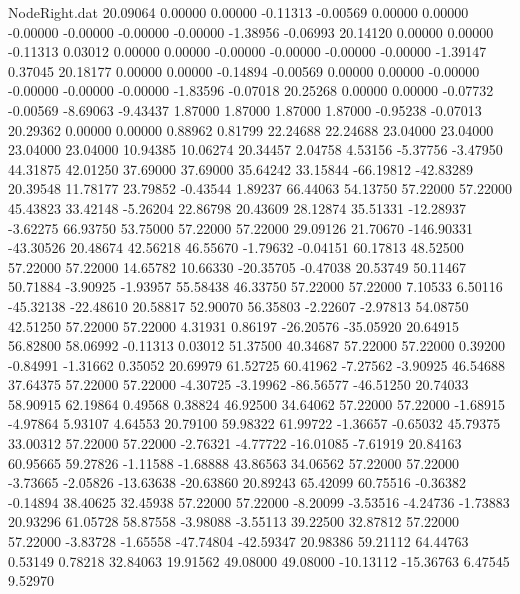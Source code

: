 \begin{filecontents}{NodeRight.dat}
  20.09064    0.00000    0.00000    -0.11313   -0.00569    0.00000    0.00000   -0.00000   -0.00000   -0.00000   -0.00000   -1.38956   -0.06993
  20.14120    0.00000    0.00000    -0.11313    0.03012    0.00000    0.00000   -0.00000   -0.00000   -0.00000   -0.00000   -1.39147    0.37045
  20.18177    0.00000    0.00000    -0.14894   -0.00569    0.00000    0.00000   -0.00000   -0.00000   -0.00000   -0.00000   -1.83596   -0.07018
  20.25268    0.00000    0.00000    -0.07732   -0.00569   -8.69063   -9.43437    1.87000    1.87000    1.87000    1.87000   -0.95238   -0.07013
  20.29362    0.00000    0.00000     0.88962    0.81799   22.24688   22.24688   23.04000   23.04000   23.04000   23.04000   10.94385   10.06274
  20.34457    2.04758    4.53156    -5.37756   -3.47950   44.31875   42.01250   37.69000   37.69000   35.64242   33.15844  -66.19812  -42.83289
  20.39548   11.78177   23.79852    -0.43544    1.89237   66.44063   54.13750   57.22000   57.22000   45.43823   33.42148   -5.26204   22.86798
  20.43609   28.12874   35.51331   -12.28937   -3.62275   66.93750   53.75000   57.22000   57.22000   29.09126   21.70670 -146.90331  -43.30526
  20.48674   42.56218   46.55670    -1.79632   -0.04151   60.17813   48.52500   57.22000   57.22000   14.65782   10.66330  -20.35705   -0.47038
  20.53749   50.11467   50.71884    -3.90925   -1.93957   55.58438   46.33750   57.22000   57.22000    7.10533    6.50116  -45.32138  -22.48610
  20.58817   52.90070   56.35803    -2.22607   -2.97813   54.08750   42.51250   57.22000   57.22000    4.31931    0.86197  -26.20576  -35.05920
  20.64915   56.82800   58.06992    -0.11313    0.03012   51.37500   40.34687   57.22000   57.22000    0.39200   -0.84991   -1.31662    0.35052
  20.69979   61.52725   60.41962    -7.27562   -3.90925   46.54688   37.64375   57.22000   57.22000   -4.30725   -3.19962  -86.56577  -46.51250
  20.74033   58.90915   62.19864     0.49568    0.38824   46.92500   34.64062   57.22000   57.22000   -1.68915   -4.97864    5.93107    4.64553
  20.79100   59.98322   61.99722    -1.36657   -0.65032   45.79375   33.00312   57.22000   57.22000   -2.76321   -4.77722  -16.01085   -7.61919
  20.84163   60.95665   59.27826    -1.11588   -1.68888   43.86563   34.06562   57.22000   57.22000   -3.73665   -2.05826  -13.63638  -20.63860
  20.89243   65.42099   60.75516    -0.36382   -0.14894   38.40625   32.45938   57.22000   57.22000   -8.20099   -3.53516   -4.24736   -1.73883
  20.93296   61.05728   58.87558    -3.98088   -3.55113   39.22500   32.87812   57.22000   57.22000   -3.83728   -1.65558  -47.74804  -42.59347
  20.98386   59.21112   64.44763     0.53149    0.78218   32.84063   19.91562   49.08000   49.08000  -10.13112  -15.36763    6.47545    9.52970

\end{filecontents}
